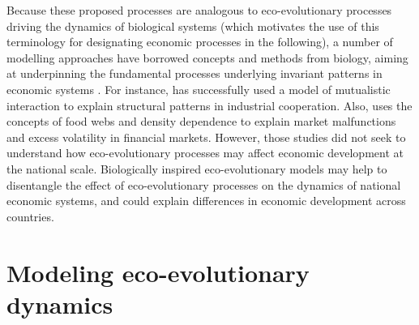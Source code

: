 % 
% 
Because these proposed processes are analogous to eco-evolutionary processes driving the dynamics of biological systems (which motivates the use of this terminology for designating economic processes in the following), a number of modelling approaches have borrowed concepts and methods from biology, aiming at underpinning the fundamental processes underlying invariant patterns in economic systems \citep{Tacchella2018,Saavedra2009a,Scholl2020,Zhang2018,Modis1997,Saavedra2014,Farmer1999,Michalakelis2011,Marasco2016,Gatabazi2019,Cauwels56,Applegate2021,Suweis2015}. 
% 
For instance, \citep{Saavedra2009a} has successfully used a model of mutualistic interaction to explain structural patterns in industrial cooperation.
% 
Also, \cite{Scholl2020} uses the concepts of food webs and density dependence to explain market malfunctions and excess volatility in financial markets.
% 
However, those studies did not seek to understand how eco-evolutionary processes may affect economic development at the national scale.
% 
Biologically inspired eco-evolutionary models may help to disentangle the effect of eco-evolutionary processes on the dynamics of national economic systems, and could explain differences in economic development across countries.

\section{Modeling eco-evolutionary dynamics}

